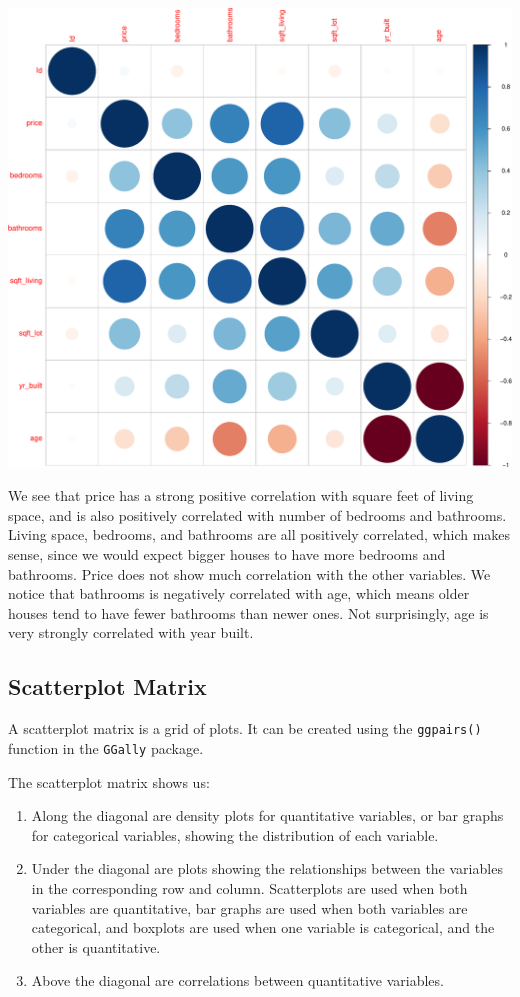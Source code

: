 \documentclass[
  letterpaper,
  DIV=11,
  numbers=noendperiod]{scrreprt}
\providecommand{\tightlist}{%
  \setlength{\itemsep}{0pt}\setlength{\parskip}{0pt}}\usepackage{longtable,booktabs,array}
\begin{document}
\includegraphics{Ch1_files/figure-pdf/unnamed-chunk-32-1.pdf}

We see that price has a strong positive correlation with square feet of
living space, and is also positively correlated with number of bedrooms
and bathrooms. Living space, bedrooms, and bathrooms are all positively
correlated, which makes sense, since we would expect bigger houses to
have more bedrooms and bathrooms. Price does not show much correlation
with the other variables. We notice that bathrooms is negatively
correlated with age, which means older houses tend to have fewer
bathrooms than newer ones. Not surprisingly, age is very strongly
correlated with year built.

\subsection{Scatterplot Matrix}\label{scatterplot-matrix}

A scatterplot matrix is a grid of plots. It can be created using the
\texttt{ggpairs()} function in the \texttt{GGally} package.

The scatterplot matrix shows us:

\begin{enumerate}
\def\labelenumi{\arabic{enumi}.}
\tightlist
\item
  Along the diagonal are density plots for quantitative variables, or
  bar graphs for categorical variables, showing the distribution of each
  variable.\\
\item
  Under the diagonal are plots showing the relationships between the
  variables in the corresponding row and column. Scatterplots are used
  when both variables are quantitative, bar graphs are used when both
  variables are categorical, and boxplots are used when one variable is
  categorical, and the other is quantitative.\\
\item
  Above the diagonal are correlations between quantitative variables.
\end{enumerate}
\end{document}
